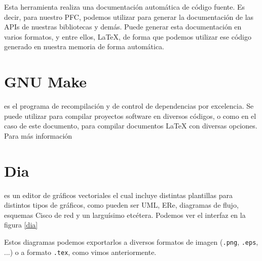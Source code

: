 Esta herramienta realiza una documentación automática de código
fuente. Es decir, para nuestro PFC, podemos utilizar para generar la
documentación de las APIs de nuestras bibliotecas y demás. Puede generar
esta documentación en varios formatos, y entre ellos, \LaTeX, de forma
que podemos utilizar ese código generado en nuestra memoria de forma
automática.

\section*{GNU Make}

 es el programa de recompilación y de control de
dependencias por excelencia. Se puede utilizar para compilar proyectos
software en diversos códigos, o como en el caso de este documento,
para compilar documentos \LaTeX{} con diversas opciones.\\

Para más información \cite{pdf:make}

\section*{Dia}

 es un editor de gráficos vectoriales el cual incluye
distintas plantillas para distintos tipos de gráficos, como pueden ser
UML, ERe, diagramas de flujo, esquemas Cisco de red y un larguísimo
etcétera. Podemos ver el interfaz en la figura \ref{dia}


Estos diagramas podemos exportarlos a diversos formatos de imagen
(\texttt{.png}, \texttt{.eps}, ...) o a formato \texttt{.tex}, como
vimos anteriormente.
